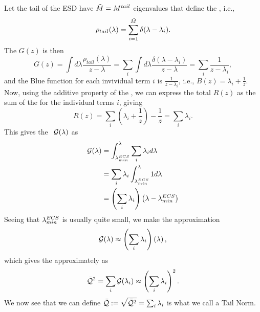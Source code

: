 Let the tail of the ESD have $\tilde{M} = M^{tail}$ eigenvalues that define the \ECS, i.e.,  
\begin{equation}
\label{eqn:spikes_model_0}
\rho_{tail}(\lambda)=\sum_{i=1}^{\tilde{M}}\delta(\lambda-\lambda_{i}) .
\end{equation}
The \GreensFunction $G(z)$ is then
\begin{equation}
\label{eqn:spikes_model_1}
G(z) = \int d\lambda \dfrac{ \rho_{tail}(\lambda) }{z - \lambda} =
\sum_{i} \int d\lambda \dfrac{\delta(\lambda-\lambda_{i}) }{z - \lambda} =
\sum_{i} \dfrac{1}{z-\lambda_{i}}  ,
\end{equation}
and the Blue function for each invividual term $i$ is $\frac{1}{z-\lambda_{i}}$, i.e., $B(z)=\lambda_{i}+\frac{1}{z}$. 
Now, using the additive property of the \RTransform, we can express the total $R(z)$ as the sum of the \RTransforms for the individual terms $i$, giving
\begin{equation}
\label{eqn:spikes_model_2}
R(z) =\sum_{i}\left(\lambda_{i}+ \dfrac{1}{z}\right) - \dfrac{1}{z}=
\sum_{i}\lambda_{i}  .
\end{equation}
This gives the \GEN~$\mathcal{G(\lambda)}$ as
\begin{align}
\label{eqn:spikes_model_3} 
\mathcal{G(\lambda)} 
&= \int_{\lambda^{ECS}_{min}}^{\lambda}\sum_{i}\lambda_{i} d\lambda \\ \nonumber
&= \sum_{i}\lambda_{i} \int_{\lambda^{ECS}_{min}}^{\lambda} 1 d\lambda \\ \nonumber
&= \left(\sum_{i}\lambda_{i}\right)\left(\lambda-\lambda^{ECS}_{min}\right)
\end{align}
Seeing that $\lambda^{ECS}_{min}$ is usually quite small, we make the approximation
\begin{align}
\mathcal{G(\lambda)}  \approx \left(\sum_{i}\lambda_{i}\right)\left(\lambda\right)  ,
\end{align}
which gives the \QualitySquared approximately as
\begin{align}
  \label{eqn:spikes_model_4}
  \bar{\mathcal{Q}}^{2} = \sum_{i}\mathcal{G}(\lambda_{i}) 
 \approx\left(\sum_{i}\lambda_{i}\right)^{2}  .
\end{align}
We now see that we can define $\bar{\mathcal{Q}}:=\sqrt{\bar{\mathcal{Q}}^{2}}=\sum_{i}\lambda_{i}$ is what we call a Tail Norm.

